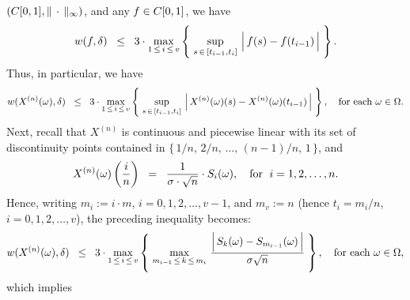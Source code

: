$\left(C[0,1],\Vert\,\cdot\,\Vert_{\infty}\right)$, and any $f \in C[0,1]$, we have
\begin{equation*}
	w(f,\delta) \;\; \leq \;\; 3 \cdot
	\max_{1\,\leq\,i\,\leq\,v}\left\{\;
	\sup_{s\,\in\,[t_{i-1},t_{i}]}\,\left\vert\,\overset{{\color{white}.}}{f}(s) - f(t_{i-1})\,\right\vert
	\;\right\}.
\end{equation*}
Thus, in particular, we have
\begin{equation*}
	w(X^{(n)}(\omega),\delta) \;\; \leq \;\; 3 \cdot
	\max_{1\,\leq\,i\,\leq\,v}\left\{\;
	\sup_{s\,\in\,[t_{i-1},t_{i}]}\,\left\vert\,X^{(n)}(\omega)(s) \overset{{\color{white}.}}{-} X^{(n)}(\omega)(t_{i-1})\,\right\vert
	\;\right\},
	\quad
	\textnormal{for each $\omega \in \Omega$.}
\end{equation*}
Next, recall that $X^{(n)}$ is continuous and piecewise linear with its set of discontinuity points
contained in $\{\,1/n,\, 2/n,\, \ldots,\, (n-1)/n,\, 1\,\}$, and
\begin{equation*}
X^{(n)}(\omega)\left(\dfrac{i}{n}\right)
\;\;=\;\; \dfrac{1}{\sigma\cdot\sqrt{n}}\cdot S_{i}(\omega),
\quad
\textnormal{for \;$i = 1,2,\ldots, n$}.
\end{equation*}
Hence, writing $m_{i} := i\cdot m$, $i = 0, 1, 2, \ldots, v - 1$, and $m_{v} := n$ (hence $t_{i} = m_{i}/n$, $i = 0, 1, 2, \ldots, v$),
the preceding inequality becomes:
\begin{equation*}
	w(X^{(n)}(\omega),\delta) \;\; \leq \;\; 3 \cdot
	\max_{1\,\leq\,i\,\leq\,v}\left\{\;
	\max_{m_{i-1}\,\leq\,k\,\leq\,m_{i}}\,
	\dfrac{\left\vert\,S_{k}(\omega) \overset{{\color{white}.}}{-} S_{m_{i-1}}(\omega)\,\right\vert}{\sigma\sqrt{n}}
	\;\right\},
	\quad
	\textnormal{for each $\omega \in \Omega$},
\end{equation*}
which implies
